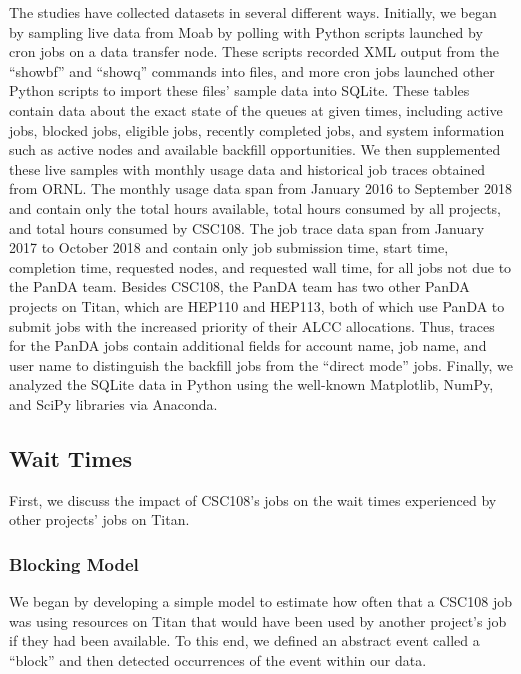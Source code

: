 The studies have collected datasets in several different ways. Initially, we
began by sampling live data from Moab by polling with Python scripts launched
by cron jobs on a data transfer node. These scripts recorded XML output from
the ``showbf'' and ``showq'' commands into files, and more cron jobs launched
other Python scripts to import these files' sample data into SQLite. These
tables contain data about the exact state of the queues at given times,
including active jobs, blocked jobs, eligible jobs, recently completed jobs,
and system information such as active nodes and available backfill
opportunities. We then supplemented these live samples with monthly usage data
and historical job traces obtained from ORNL. The monthly usage data span from
January 2016 to September 2018 and contain only the total hours available,
total hours consumed by all projects, and total hours consumed by CSC108. The
job trace data span from January 2017 to October 2018 and contain only job
submission time, start time, completion time, requested nodes, and requested
wall time, for all jobs not due to the PanDA team. Besides CSC108, the PanDA
team has two other PanDA projects on Titan, which are HEP110 and HEP113, both
of which use PanDA to submit jobs with the increased priority of their ALCC
allocations. Thus, traces for the PanDA jobs contain additional fields for
account name, job name, and user name to distinguish the backfill jobs from the
``direct mode'' jobs. Finally, we analyzed the SQLite data in Python using the
well-known Matplotlib, NumPy, and SciPy libraries via Anaconda.

\subsection{Wait Times}
\label{subsec:waittimes}

First, we discuss the impact of CSC108's jobs on the wait times experienced by
other projects' jobs on Titan.

\subsubsection{Blocking Model}
\label{subsubsec:blockingmodel}

We began by developing a simple model to estimate how often that a CSC108 job
was using resources on Titan that would have been used by another project's job
if they had been available. To this end, we defined an abstract event called a
``block'' and then detected occurrences of the event within our data.

